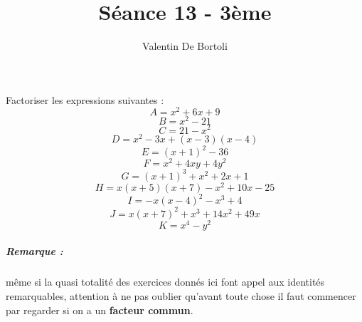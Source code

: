 \documentclass[10pt,a4paper]{article}
\title{Séance 13 - 3ème}
\author{Valentin De Bortoli}
\begin{document}
\maketitle
Factoriser les expressions suivantes :
\begin{equation}
A = x^2+6x+9
\end{equation}
\begin{equation}
B = x^2-21
\end{equation}
\begin{equation}
C = 21 - x^2
\end{equation}
\begin{equation}
D = x^2-3x+(x-3)(x-4)
\end{equation}
\begin{equation}
E = (x+1)^2-36
\end{equation}
\begin{equation}
F = x^2+4xy+4y^2
\end{equation}
\begin{equation}
G = (x+1)^3+x^2+2x+1
\end{equation}
\begin{equation}
H = x(x+5)(x+7) - x^2+10x-25
\end{equation}
\begin{equation}
I = -x(x-4)^2 -x^3+4
\end{equation}
\begin{equation}
J = x(x+7)^2 +x^3+14x^2+49x
\end{equation}
\begin{equation}
K = x^4 -y^2
\end{equation}
\subparagraph{Remarque :} même si la quasi totalité des exercices donnés ici font appel aux identités remarquables, attention à ne pas oublier qu'avant toute chose il faut commencer par regarder si on a un \textbf{facteur commun}.
\end{document}
